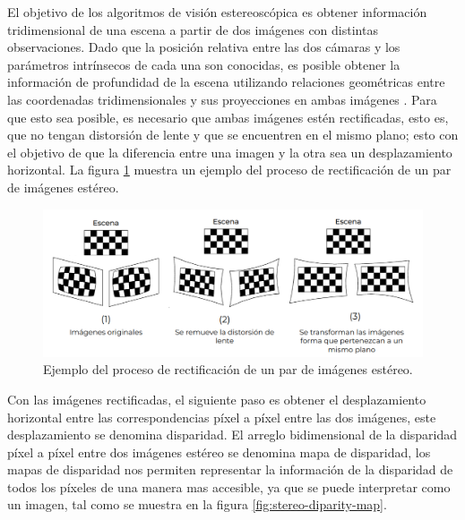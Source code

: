 El objetivo de los algoritmos de visión estereoscópica es obtener información tridimensional de una escena a partir de dos imágenes con distintas observaciones. Dado que la posición relativa entre las dos cámaras y los parámetros intrínsecos de cada una son conocidas, es posible obtener la información de profundidad de la escena utilizando relaciones geométricas entre las coordenadas tridimensionales y sus proyecciones en ambas imágenes \cite{sterovis}. Para que esto sea posible, es necesario que ambas imágenes estén rectificadas, esto es, que no tengan distorsión de lente y que se encuentren en el mismo plano; esto con el objetivo de que la diferencia entre una imagen y la otra sea un desplazamiento horizontal. La figura \ref{fig:stereo-rectification} muestra un ejemplo del proceso de rectificación de un par de imágenes estéreo.

\begin{figure}[H]
    \centering
    \includegraphics[scale=0.4]{partes/ImgJoao/rectificacion.png}
    \caption[Ejemplo del proceso de rectificación de un par de imágenes estéreo.]{Ejemplo del proceso de rectificación de un par de imágenes estéreo\footnotemark.}
    \label{fig:stereo-rectification}
\end{figure}

Con las imágenes rectificadas, el siguiente paso es obtener el desplazamiento horizontal entre las correspondencias píxel a píxel entre las dos imágenes, este desplazamiento se denomina disparidad. El arreglo bidimensional de la disparidad píxel a píxel entre dos imágenes estéreo se denomina mapa de disparidad, los mapas de disparidad nos permiten representar la información de la disparidad de todos los píxeles de una manera mas accesible, ya que se puede interpretar como un imagen, tal como se muestra en la figura \ref{fig:stereo-diparity-map}.

